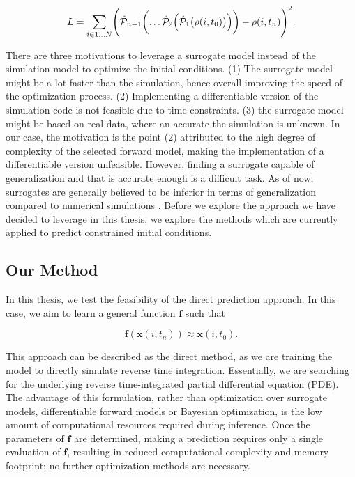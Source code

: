 \documentclass{article}
\begin{document}
\begin{equation}
    L = \sum_{i \in 1 \dots N} \Biggl(\hat{\mathcal{P}}_{n-1}\biggl( \dots \hat{\mathcal{P}}_2\Bigl(\hat{\mathcal{P}}_1\bigl(\rho(i, t_{0})\bigr)\Bigr)\biggr) - \rho(i, t_n)\Biggr)^2.
\end{equation}

There are three motivations to leverage a surrogate model instead of the simulation model to optimize the initial conditions. (1) The surrogate model might be a lot faster than the simulation, hence overall improving the speed of the optimization process. (2) Implementing a differentiable version of the simulation code is not feasible due to time constraints. (3) the surrogate model might be based on real data, where an accurate the simulation is unknown. In our case, the motivation is the point (2) attributed to the high degree of complexity of the selected forward model, making the implementation of a differentiable version unfeasible. However, finding a surrogate capable of generalization and that is accurate enough is a difficult task. As of now, surrogates are generally believed to be inferior in terms of generalization compared to numerical simulations \citep{koehler2024apebench}. Before we explore the approach we have decided to leverage in this thesis, we explore the methods which are currently applied to predict constrained initial conditions.


\subsection{Our Method}
In this thesis, we test the feasibility of the direct prediction approach. In this case, we aim to learn a general function \(\mathbf{f}\) such that

\begin{equation}
\label{goal}
    \mathbf{f}(\mathbf{x}(i, t_{n})) \approx \mathbf{x}(i, t_{0}).
\end{equation}

This approach can be described as the direct method, as we are training the model to directly simulate reverse time integration. Essentially, we are searching for the underlying reverse time-integrated partial differential equation (PDE). The advantage of this formulation, rather than optimization over surrogate models, differentiable forward models or Bayesian optimization, is the low amount of computational resources required during inference. Once the parameters of \(\mathbf{f}\) are determined, making a prediction requires only a single evaluation of \(\mathbf{f}\), resulting in reduced computational complexity and memory footprint; no further optimization methods are necessary. 
\end{document}
